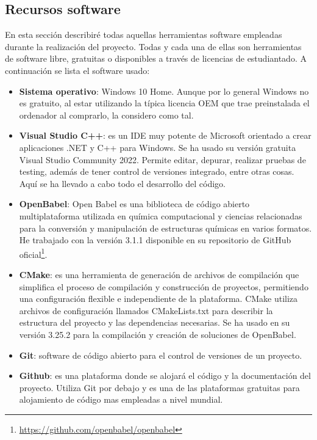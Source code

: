 \subsection{Recursos software} \label{recursos_software}
En esta sección describiré todas aquellas herramientas software empleadas durante la realización del proyecto. Todas y cada una de ellas son herramientas de software libre, gratuitas o disponibles a través de licencias de estudiantado. A continuación se lista el software usado:
\begin{itemize}
    \item \textbf{Sistema operativo}: Windows 10 Home. Aunque por lo general Windows no es gratuito, al estar utilizando la típica licencia OEM que trae preinstalada el ordenador al comprarlo, la considero como tal.
    
    \item \textbf{Visual Studio C++}: es un IDE muy potente de Microsoft orientado a crear aplicaciones .NET y C++ para Windows. Se ha usado su versión gratuita Visual Studio Community 2022. Permite editar, depurar, realizar pruebas de testing, además de tener control de versiones integrado, entre otras cosas. Aquí se ha llevado a cabo todo el desarrollo del código.
    
    \item \textbf{OpenBabel}: Open Babel es una biblioteca de código abierto multiplataforma utilizada en química computacional y ciencias relacionadas para la conversión y manipulación de estructuras químicas en varios formatos. He trabajado con la versión 3.1.1 disponible en su repositorio de GitHub oficial\footnote{\url{https://github.com/openbabel/openbabel}}.

    \item \textbf{CMake}: es una herramienta de generación de archivos de compilación que simplifica el proceso de compilación y construcción de proyectos, permitiendo una configuración flexible e independiente de la plataforma. CMake utiliza archivos de configuración llamados CMakeLists.txt para describir la estructura del proyecto y las dependencias necesarias. Se ha usado en su versión 3.25.2 para la compilación y creación de soluciones de OpenBabel.

    \item \textbf{Git}: software de código abierto para el control de versiones de un proyecto.
    \item \textbf{Github}: es una plataforma donde se alojará el código y la documentación del proyecto. Utiliza Git por debajo y es una de las plataformas gratuitas para alojamiento de código mas empleadas a nivel mundial.


\end{itemize}
